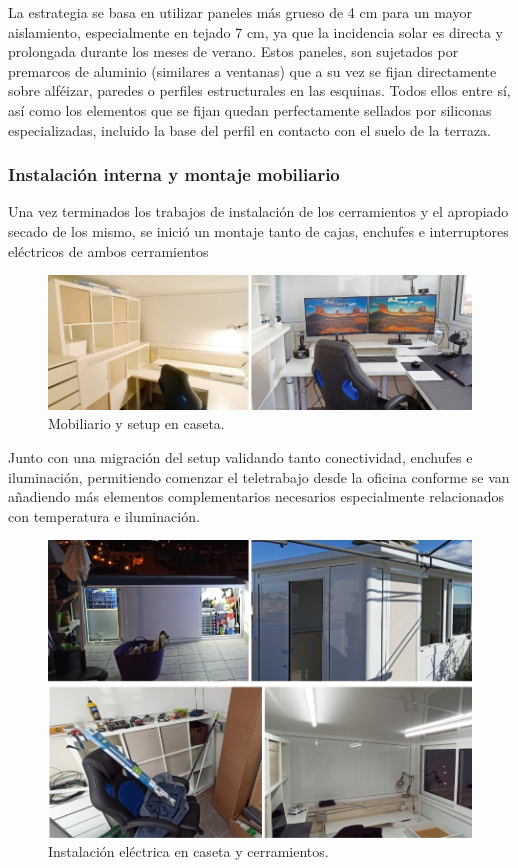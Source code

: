 La estrategia se basa en utilizar paneles más grueso de 4 cm para un mayor aislamiento, especialmente en tejado 7 cm, ya que la incidencia solar es directa y prolongada durante los meses de verano. Estos paneles, son sujetados por premarcos de aluminio (similares a ventanas) que a su vez se fijan directamente sobre alféizar, paredes o perfiles estructurales en las esquinas. 
Todos ellos entre sí, así como los elementos que se fijan quedan perfectamente sellados por siliconas especializadas, incluido la base del perfil en contacto con el suelo de la terraza.

\subsubsection{Instalación interna y montaje mobiliario}
Una vez terminados los trabajos de instalación de los cerramientos y el apropiado secado de los mismo, se inició un montaje tanto de cajas, enchufes e interruptores eléctricos de ambos cerramientos
\begin{figure}[!htb]
\begin{center}
\includegraphics[width=1\textwidth]{./figuras/caseta_mobiliarioysetup.jpg}
\caption{Mobiliario y setup en caseta.}
\label{F:caseta_mobiliarioysetup}
\end{center}
\end{figure}
Junto con una migración del setup validando tanto conectividad, enchufes e iluminación, permitiendo comenzar el teletrabajo desde la oficina conforme se van añadiendo más elementos complementarios necesarios especialmente relacionados con temperatura e iluminación.
\begin{figure}[!htb]
\begin{center}
\includegraphics[width=1\textwidth]{./figuras/caseta_electricidad.jpg}
\caption{Instalación eléctrica en caseta y cerramientos.}
\label{F:caseta_electricidad}
\end{center}
\end{figure}

